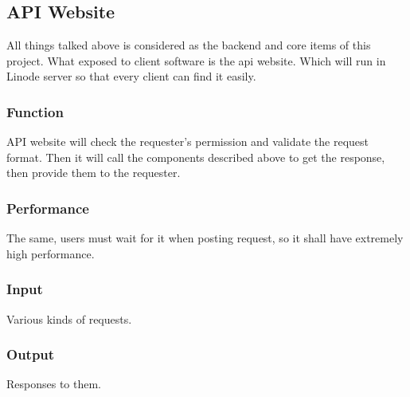 
\subsection{API Website}
  All things talked above is considered as the backend and core items of this project.
  What exposed to client software is the api website. Which will run in Linode server so that every client can find it easily.

  \subsubsection{Function}
    API website will check the requester's permission and validate the request format.
    Then it will call the components described above to get the response, then provide them to the requester.

  \subsubsection{Performance}
    The same, users must wait for it when posting request, so it shall have extremely high performance.

  \subsubsection{Input}
    Various kinds of requests.

  \subsubsection{Output}
    Responses to them.

